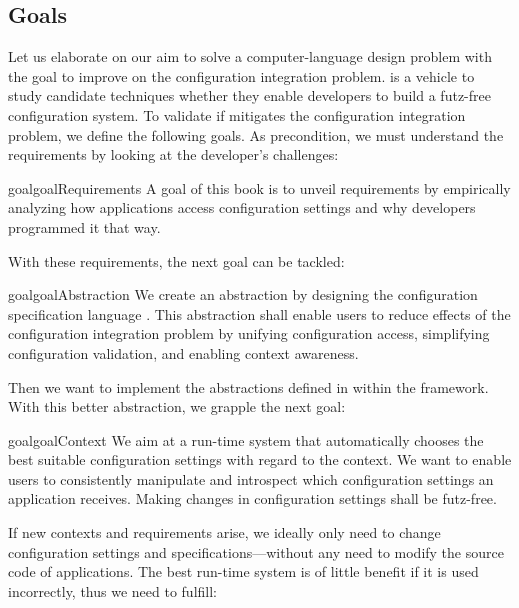 \subsection{Goals}


Let us elaborate on our aim to solve a computer-language design problem with the goal to improve on the configuration integration problem.
\elektra{} is a vehicle to study candidate techniques whether they enable developers to build a futz-free configuration system.
To validate if \elektra{} mitigates the configuration integration problem, we define the following goals.
As precondition, we must understand the requirements by looking at the developer's challenges:

\begin{restatable}[Requirement]{goal}{goalRequirements}
A goal of this book is to unveil requirements by empirically analyzing how applications access configuration settings and why developers programmed it that way.
\end{restatable}

With these requirements, the next goal can be tackled:

\begin{restatable}[Abstraction]{goal}{goalAbstraction}
We create an abstraction by designing the configuration specification language .
This abstraction shall enable users to reduce effects of the configuration integration problem by unifying configuration access, simplifying configuration validation, and enabling context awareness.
\end{restatable}

Then we want to implement the abstractions defined in  within the \elektra{} framework.
With this better abstraction, we grapple the next goal:

\begin{restatable}[Context]{goal}{goalContext}
We aim at a run-time system that automatically chooses the best suitable configuration settings with regard to the context.
We want to enable users to consistently manipulate and introspect which configuration settings an application receives.
Making changes in configuration settings shall be futz-free.
\end{restatable}

If new contexts and requirements arise, we ideally only need to change configuration settings and specifications---without any need to modify the source code of applications.
The best run-time system is of little benefit if it is used incorrectly, thus we need to fulfill:

